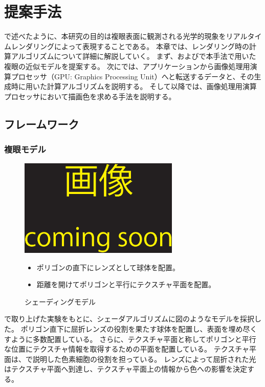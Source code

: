 \chapter{提案手法}
\label{CMethod}

で述べたように、本研究の目的は複眼表面に観測される光学的現象をリアルタイムレンダリングによって表現することである。
本章では、レンダリング時の計算アルゴリズムについて詳細に解説していく。
まず、およびで本手法で用いた複眼の近似モデルを提案する。
次にでは、アプリケーションから画像処理用演算プロセッサ（GPU: Graphics Processing Unit）へと転送するデータと、その生成時に用いた計算アルゴリズムを説明する。
そして以降では、画像処理用演算プロセッサにおいて描画色を求める手法を説明する。

\section{フレームワーク}
\label{SFramework}

\subsection{複眼モデル}
\label{SSModel}

\begin{figure}[h]
  \centering
  \includegraphics[width=3.0in]{./img/TEMP}
  \caption{シェーディングモデル}{\begin{itemize}\item ポリゴンの直下にレンズとして球体を配置。\item 距離を開けてポリゴンと平行にテクスチャ平面を配置。\end{itemize}}
  \label{FModel}
\end{figure}

で取り上げた実験をもとに、シェーダアルゴリズムに図のようなモデルを採択した。
ポリゴン直下に屈折レンズの役割を果たす球体を配置し、表面を埋め尽くすように多数配置している。
さらに、テクスチャ平面と称してポリゴンと平行な位置にテクスチャ情報を取得するための平面を配置している。
テクスチャ平面は、\secref{}で説明した色素細胞の役割を担っている。
レンズによって屈折された光はテクスチャ平面へ到達し、テクスチャ平面上の情報から色への影響を決定する。

